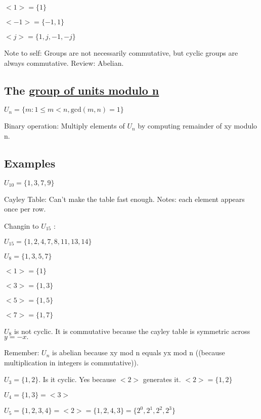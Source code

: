 \documentclass[class=scrartcl, crop=false]{standalone}
\begin{document}
$<1> = \{1\}$

$<-1> = \{-1, 1\}$

$<j> = \{1, j, -1, -j\}$

Note to self: Groups are not necessarily commutative, but cyclic groups are always commutative. Review: Abelian. 

\subsection{The \underline{group of units modulo n}}

$U_n = \{m: 1 \leq m < n, \text{gcd}(m, n) = 1\}$ 

Binary operation: Multiply elements of $U_n$ by computing remainder of xy modulo n.

\subsection{Examples}

$U_{10} = \{1, 3, 7, 9\}$

Cayley Table: Can't make the table fast enough. Notes: each element appears once per row.

Changin to $U_{15}$ :

$U_{15} = \{1, 2, 4, 7, 8, 11, 13, 14\}$

$U_8 = \{1, 3, 5, 7\}$

$<1> = \{1\}$

$<3> = \{1, 3\}$

$<5> = \{1, 5\}$

$<7> = \{1, 7\}$

 $U_8$ is not cyclic. It is commutative because the cayley table is symmetric across $y = -x.$ 

 Remember: $U_n$ is abelian because xy mod n equals yx mod n ((because multiplication in integers is commutative)).

 $U_3 = \{1, 2\}$. Is it cyclic. Yes because $<2>$ generates it. $<2> = \{1, 2\}$

 $U_4 = \{1, 3\} = <3>$

 $U_5 = \{1, 2, 3, 4\} = <2> = \{1, 2, 4, 3\} = \{2^0, 2^1, 2^2, 2^3\}$
\end{document}
